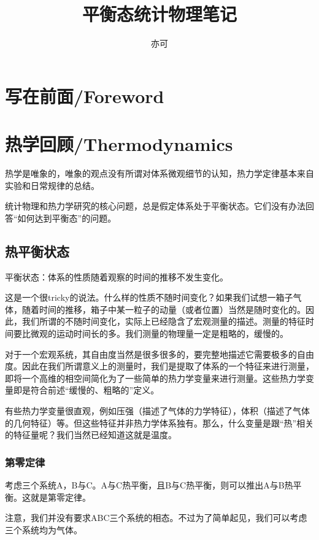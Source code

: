 \documentclass[a4paper, 10pt, openany]{book}%
\begin{document}
  \title{ \heiti 平衡态统计物理笔记}
  \author{亦可}
  \maketitle
  \tableofcontents


  \newpage

  \chapter{写在前面/Foreword}
  \chapter{热学回顾/Thermodynamics}

  热学是唯象的，唯象的观点没有所谓对体系微观细节的认知，热力学定律基本来自实验和日常规律的总结。

  统计物理和热力学研究的核心问题，总是假定体系处于平衡状态。它们没有办法回答“如何达到平衡态”的问题。

\section{热平衡状态}
平衡状态：体系的性质随着观察的时间的推移不发生变化。

这是一个很tricky的说法。什么样的性质不随时间变化？如果我们试想一箱子气体，随着时间的推移，箱子中某一粒子的动量（或者位置）当然是随时变化的。因此，我们所谓的不随时间变化，实际上已经隐含了宏观测量的描述。测量的特征时间要比微观的运动时间长的多。我们测量的物理量一定是粗略的，缓慢的。

对于一个宏观系统，其自由度当然是很多很多的，要完整地描述它需要极多的自由度。因此在我们所谓意义上的测量时，我们是提取了体系的一个特征来进行测量，即将一个高维的相空间简化为了一些简单的热力学变量来进行测量。这些热力学变量即是符合前述“缓慢的、粗略的”定义。

有些热力学变量很直观，例如压强（描述了气体的力学特征），体积（描述了气体的几何特征）等。但这些特征并非热力学体系独有。那么，什么变量是跟“热”相关的特征量呢？我们当然已经知道这就是温度。

\subsection{第零定律}

考虑三个系统A，B与C。A与C热平衡，且B与C热平衡，则可以推出A与B热平衡。这就是第零定律。

注意，我们并没有要求ABC三个系统的相态。不过为了简单起见，我们可以考虑三个系统均为气体。
\end{document}
